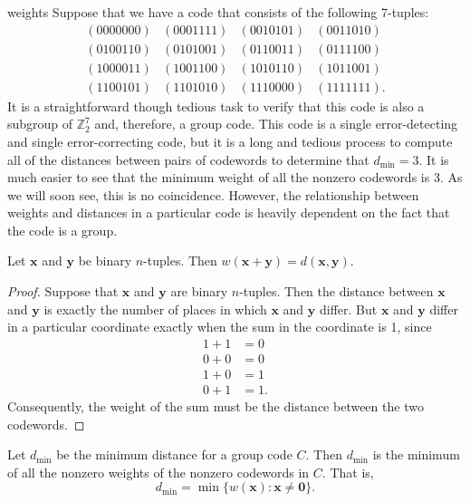 
\begin{example}{weights}
Suppose that we have a code that consists of the following 7-tuples: 
\[
\begin{array}{cccc}
(0000000) & (0001111) & (0010101) & (0011010) \\
(0100110) & (0101001) & (0110011) & (0111100) \\
(1000011) & (1001100) & (1010110) & (1011001) \\
(1100101) & (1101010) & (1110000) & (1111111).
\end{array}
\]
It is a straightforward though tedious task to verify that this code
is also a subgroup of ${\mathbb Z}_2^7$ and, therefore, a group code.
This code is a single error-detecting and single error-correcting 
code, but
it is a long and tedious process to compute all of the distances
between  pairs of codewords to determine that $d_{\min} = 3$. It is
much easier to see that the minimum weight of all the nonzero
codewords is 3. As we will soon see, this is no coincidence.
However, the relationship between weights and distances in a
particular code is heavily dependent on the fact that the code is a
group. 
\end{example}
 
 
\begin{lemma}
Let ${\mathbf x}$ and ${\mathbf y}$ be  binary $n$-tuples. Then $w({\mathbf
x} + {\mathbf y}) = d({\mathbf x}, {\mathbf y})$. 
\end{lemma}
 
 
\begin{proof}
Suppose that ${\mathbf x}$ and ${\mathbf y}$ are binary $n$-tuples. Then
the distance between ${\mathbf x}$ and ${\mathbf y}$ is exactly the number
of places in which ${\mathbf x}$ and ${\mathbf y}$ differ. But ${\mathbf x}$
and ${\mathbf y}$ differ in a particular coordinate exactly when the sum
in the coordinate is 1, since
\begin{align*}
1 + 1 & = 0 \\
0 + 0 & = 0 \\
1 + 0 & = 1 \\
0 + 1 & = 1.
\end{align*}
Consequently, the weight of the sum must be the distance between the two
codewords.
\end{proof}
 
 
\begin{theorem}
Let $d_{\min}$ be the minimum distance for a group code $C$. Then
$d_{\min}$ is the minimum of all the nonzero weights of the nonzero
codewords in $C$. That is, 
\[
d_{\min} = \min\{ w({\mathbf x}) : { {\mathbf x} \neq {\mathbf 0} } \}.
\]
\end{theorem}
 
